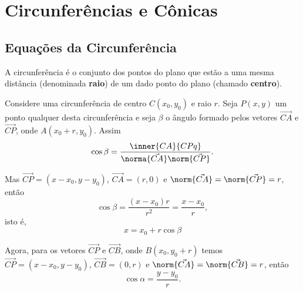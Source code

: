 
\chapter{Circunferências e C\^onicas} %
\label{cha:circunferencias_e_conicas}

\section{Equações da Circunferência} %
\label{sec:equacoes_da_circunferencias}

\begin{definicao}
  A circunferência é o conjunto dos pontos do plano que estão a uma mesma distância (denominada \textbf{raio}) de um dado ponto do plano (chamado \textbf{centro}).
\end{definicao}

Considere uma circunferência de centro $C(x_0,y_0)$ e raio $r$. Seja $P(x,y)$ um ponto qualquer desta circunferência e seja $\beta$ o ângulo formado pelos vetores $\vec{CA}$ e $\vec{CP}$, onde $A(x_0 + r, y_0)$. Assim
\[
  \cos\beta = \dfrac{\inner{CA}{CPq}}{\norma{\vec{CA}}\norm{\vec{CP}}}.
\]

Mas $\vec{CP} = (x - x_0, y - y_0)$, $\vec{CA} = (r, 0)$ e $\norm{\vec{CA}} = \norm{\vec{CP}} = r$, então
\[
  \cos\beta = \dfrac{(x - x_0)r}{r^2} = \dfrac{x - x_0}{r},
\]
isto é,
\begin{equation}\label{equacaoparametricaX}
  x = x_0 + r\cos\beta
\end{equation}

Agora, para os vetores $\vec{CP}$ e $\vec{CB}$, onde $B(x_0, y_0 + r)$ temos $\vec{CP} = (x - x_0, y - y_0)$, $\vec{CB} = (0, r)$ e $\norm{\vec{CA}} = \norm{\vec{CB}} = r$, então
\begin{equation}\label{equacaoinicialY}
  \cos\alpha = \dfrac{y - y_0}{r}.
\end{equation}

